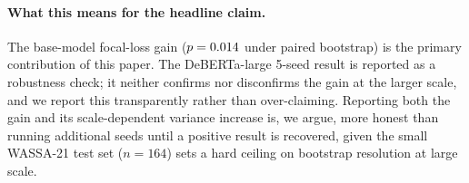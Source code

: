 \paragraph{What this means for the headline claim.}
The base-model focal-loss gain ($p = 0.014$ under paired
bootstrap) is the primary contribution of this paper. The
DeBERTa-large 5-seed result is reported as a robustness check; it
neither confirms nor disconfirms the gain at the larger scale, and we
report this transparently rather than over-claiming. Reporting both
the gain and its scale-dependent variance increase is, we argue, more
honest than running additional seeds until a positive result is
recovered, given the small WASSA-21 test set ($n = 164$) sets a hard
ceiling on bootstrap resolution at large scale.
